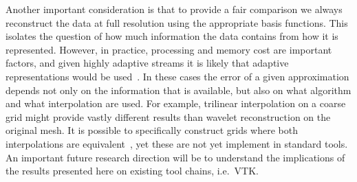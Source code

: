 Another important consideration is that to provide a fair comparison we always reconstruct the data
at full resolution using the appropriate basis functions. This isolates the question of how much
information the data contains from how it is represented. However, in practice, processing and
memory cost are important factors, and given highly adaptive streams it is likely that adaptive
representations would be used~\cite{gigavoxels,Gobbetti2008,vdb2013}. In these cases the error of a
given approximation depends not only on the information that is available, but also on what
algorithm and what interpolation are used. For example, trilinear interpolation on a coarse grid
might provide vastly different results than wavelet reconstruction on the original mesh. It is
possible to specifically construct grids where both interpolations are equivalent~\cite{weiss}, yet
these are not yet implement in standard tools. An important future research direction will be to
understand the implications of the results presented here on existing tool chains, i.e.\ VTK.

